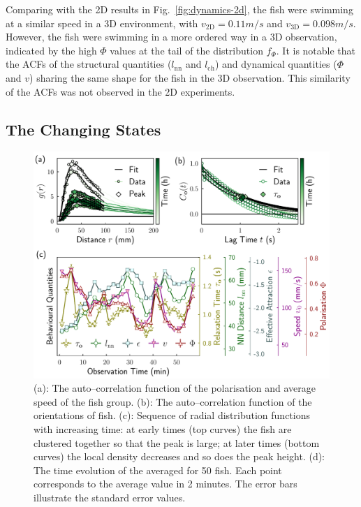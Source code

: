\documentclass[11pt,twoside]{report}
\begin{document}
Comparing with the 2D results in Fig.~\ref{fig:dynamics-2d}, the fish were swimming at a similar speed in a 3D environment, with $v_\mathrm{2D} = 0.11m/s$ and $v_\mathrm{3D} = 0.098m/s$. However, the fish were swimming in a more ordered way in a 3D observation, indicated by the high $\Phi$ values at the tail of the distribution $f_\Phi$. 
It is notable that the ACFs of the structural quantities ($l_\mathrm{nn}$ and $l_\mathrm{ch}$) and dynamical quantities ($\Phi$ and $v$) sharing the same shape for the fish in the 3D observation. This similarity of the ACFs was not observed in the 2D experiments.



\subsection{The Changing States}
\label{section:change-states-3d}

\begin{figure}
  \includegraphics[width=\linewidth,outer]{change-states-3d-50}
  \caption[The behavioural descriptors of 50 zebrafish]{
  	(a): The auto--correlation function of the polarisation and average speed of the fish group.
	(b): The auto--correlation function of the orientations of fish.
	(c): Sequence of radial distribution functions with increasing time: at early times (top curves) the fish are clustered together so that the peak is large; at later times (bottom curves) the local density decreases and so does the peak height.
	(d): The time evolution of the averaged {\descriptors} for 50 {\smallfish} fish. Each point corresponds to the average value in 2 minutes.
	The error bars illustrate the standard error values.
  }
  \label{fig:change-states-3d}
\end{figure}
\end{document}
